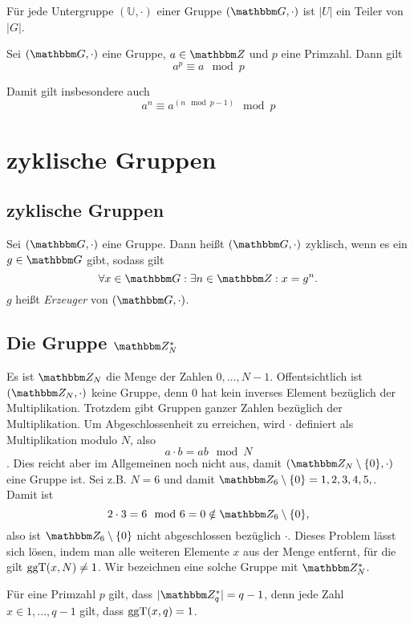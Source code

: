 \begin{theorem}
   Für jede Untergruppe $(\mathbb{U}, \cdot)$ einer Gruppe $(\G, \cdot)$
   ist $|U|$ ein Teiler von $|G|$.   
 \end{theorem}

 \begin{theorem}
   Sei $(\G, \cdot)$ eine Gruppe, $a \in \Z{}$ und $p$ eine
   Primzahl. Dann gilt
   \[a^p \equiv a \mod p\]
 \end{theorem}
Damit gilt insbesondere auch
\[a^n \equiv a^{(n \mod p-1)} \mod p\]
\section{zyklische Gruppen}

\subsection{zyklische Gruppen}
\begin{definition}
  Sei $(\G, \cdot)$ eine Gruppe. Dann heißt $(\G, \cdot)$ zyklisch, wenn
  es ein $g \in \G$ gibt, sodass gilt
\[
  \forall x \in \G: \exists n \in \Z{}: x=g^n.
\]
$g$ heißt \textit{Erzeuger} von $(\G, \cdot)$.
\end{definition}

\subsection{Die Gruppe $\Z{N}^*$}
Es ist $\Z{N}$ die Menge der Zahlen ${0,\dots , N-1}$. Offentsichtlich
ist $(\Z{N}, \cdot)$ keine Gruppe, denn $0$ hat kein inverses Element
bezüglich der Multiplikation.
Trotzdem gibt Gruppen ganzer Zahlen bezüglich der
Multiplikation. Um Abgeschlossenheit zu erreichen, wird $\cdot$
definiert als Multiplikation modulo $N$, also 
\[a \cdot b = ab \mod N\]. Dies reicht aber im Allgemeinen noch nicht
aus, damit $(\Z{N}\setminus \{0\}, \cdot)$ eine Gruppe ist. Sei z.B. $N=6$ und
damit $\Z{6}\setminus \{0\} = {1,2,3,4,5,}$. Damit ist 
\[
2 \cdot 3 = 6 \mod 6 = 0 \notin \Z{6}\setminus \{0\},
\]
also ist $\Z{6}\setminus \{0\}$ nicht abgeschlossen bezüglich $\cdot$. 
Dieses Problem lässt sich lösen, indem man alle weiteren Elemente $x$ aus
der Menge entfernt, für die gilt $\operatorname{ggT}(x, N)\neq 1$. Wir bezeichnen eine
solche Gruppe mit $\Z{N}^*$. 

Für eine Primzahl $p$ gilt, dass  $|\Z{q}^*|= q-1$, denn jede Zahl $x\in
{1,..., q-1}$ gilt, dass $\operatorname{ggT}(x, q)=1$.